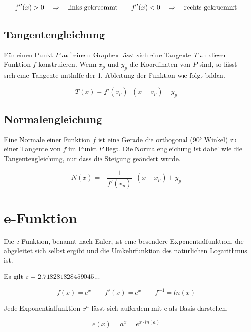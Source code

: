 \begin{equation*}
    f''(x) > 0 \quad \Rightarrow \quad \textnormal{links gekruemmt} \qquad f''(x) < 0 \quad \Rightarrow \quad \textnormal{rechts gekruemmt}
\end{equation*}

\subsection{Tangentengleichung}

Für einen Punkt $P$ auf einem Graphen lässt sich eine Tangente $T$ an dieser Funktion $f$
konstruieren. Wenn $x_p$ und $y_p$ die Koordinaten von $P$ sind, so lässt sich
eine Tangente mithilfe der 1. Ableitung der Funktion wie folgt bilden.

\begin{equation*}
    T(x) = f'(x_p) \cdot (x - x_p) + y_p
\end{equation*}

\subsection{Normalengleichung}

Eine Normale einer Funktion $f$ ist eine Gerade die orthogonal (90° Winkel) zu einer Tangente
von $f$ im Punkt $P$ liegt. Die Normalengleichung ist dabei wie die Tangentengleichung, nur
dass die Steigung geändert wurde.

\begin{equation*}
    N(x) = -\frac{1}{f'(x_p)} \cdot (x - x_p) + y_p
\end{equation*}

\clearpage

\section{e-Funktion}

Die e-Funktion, benannt nach Euler, ist eine besondere Exponentialfunktion, die abgeleitet
sich selbst ergibt und die Umkehrfunktion des natürlichen Logarithmus ist.

Es gilt $e = 2.7 1828 1828 45 90 45 ...$

\begin{equation*}
    f(x) = e^x \qquad f'(x) = e^x \qquad f^{-1} = ln(x)
\end{equation*}

Jede Exponentialfunktion $x^a$ lässt sich außerdem mit e als Basis darstellen.

\begin{equation*}
    e(x) = a^x = e^{x \cdot ln(a)}
\end{equation*}

